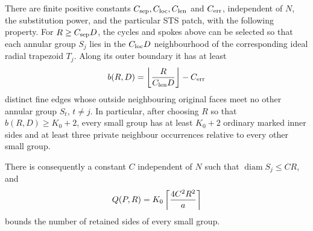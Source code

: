 \begin{lemma}
\label{lem:quantitative-sector}
There are finite positive constants $C_{\rm sep},C_{\rm loc},C_{\rm len}$
and $C_{\rm err}$, independent of $N$, the substitution power, and the
particular STS patch, with the following property.  For
$R\ge C_{\rm sep}D$, the cycles and spokes above can be selected so that
each annular group $S_j$ lies in the $C_{\rm loc}D$ neighbourhood of the
corresponding ideal radial trapezoid $T_j$.  Along its outer boundary it
has at least
\[
 b(R,D)=\left\lfloor {R\over C_{\rm len}D}\right\rfloor-C_{\rm err}
\]
distinct fine edges whose outside neighbouring original faces meet no
other annular group $S_t$, $t\ne j$.  In particular, after choosing $R$
so that $b(R,D)\ge K_0+2$, every small group has at least $K_0+2$ ordinary
marked inner sides and at least three private neighbour occurrences
relative to every other small group.

There is consequently a constant $C$ independent of $N$ such that
$\operatorname{diam}S_j\le CR$, and
\[
 Q(P,R)=K_0\left\lceil {4C^2R^2\over a}\right\rceil
\]
bounds the number of retained sides of every small group.
\end{lemma}

